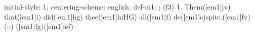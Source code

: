 initial-style: 1;
centering-scheme: english;
def-m1: \grealign;
(f3) 1. Them([em1]jv) that([em1]i) did([em1]hg) thee([em1]hiHG) all([em1]f) de([em1]e)spite.([em1]fv) (::) ([em1]fg)([em1]fef)